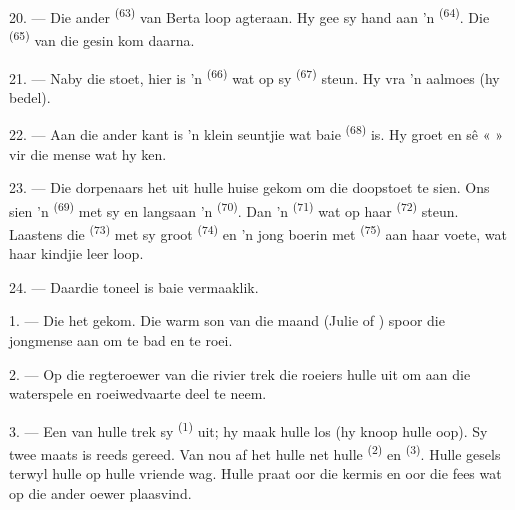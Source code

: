 20. --- Die ander  \textsuperscript{(63)} van Berta loop agteraan. Hy gee
sy hand aan 'n  \textsuperscript{(64)}. Die 
\textsuperscript{(65)} van die gesin kom daarna.

\VUsaut{4.6mm}
\VUsaut{3.4mm}

21. --- Naby die stoet, hier is 'n  \textsuperscript{(66)} wat op sy
 \textsuperscript{(67)} steun. Hy vra 'n aalmoes (hy bedel).

22. --- Aan die ander kant is 'n klein seuntjie wat baie 
\textsuperscript{(68)} is. Hy groet en sê «  » vir die mense wat hy
ken.

23. --- Die dorpenaars het uit hulle huise gekom om die doopstoet te sien. Ons sien 'n
 \textsuperscript{(69)} met sy  en langsaan 'n
 \textsuperscript{(70)}. Dan 'n  \textsuperscript{(71)}
wat op haar  \textsuperscript{(72)} steun. Laastens die
 \textsuperscript{(73)} met sy groot 
\textsuperscript{(74)} en 'n jong boerin met 
\textsuperscript{(75)} aan haar voete, wat haar kindjie leer loop.

24. --- Daardie toneel is baie vermaaklik.
\VUsaut{4.0mm}

\VUsaut{3.0mm}

\VUsaut{2.4mm}

\VUsaut{3.0mm}

1. --- Die  het gekom. Die warm son van die maand  (Julie of
) spoor die jongmense aan om te bad en te roei.

2. --- Op die regteroewer van die rivier trek die roeiers hulle uit om aan die
waterspele en roeiwedvaarte deel te neem.

3. --- Een van hulle trek sy  \textsuperscript{(1)} uit; hy maak hulle
los (hy knoop hulle oop). Sy twee maats is reeds gereed. Van nou af het hulle net hulle
 \textsuperscript{(2)} en 
\textsuperscript{(3)}. Hulle gesels terwyl hulle op hulle vriende wag. Hulle praat oor
die kermis en oor die fees wat op die ander oewer plaasvind.

